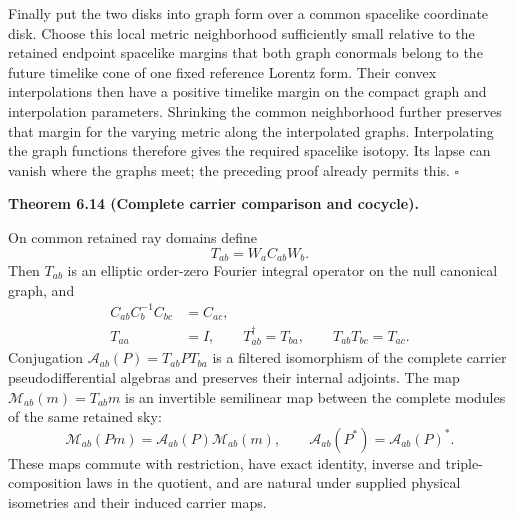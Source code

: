 \documentclass[
  english,
  11pt,
  reqno]{amsart}
\makeatletter
\newcommand{\pandocstatementheading}[1]{%
  \par\if@nobreak\else
    \addpenalty{\@beginparpenalty}%
    \addvspace{.5\baselineskip plus .2\baselineskip minus .2\baselineskip}%
  \fi
  {\normalfont\bfseries #1\par}%
  \nobreak\@afterindenttrue\@afterheading
}
\makeatother
\begin{document}
Finally put the two disks into graph form over a common spacelike
coordinate disk. Choose this local metric neighborhood sufficiently
small relative to the retained endpoint spacelike margins that both
graph conormals belong to the future timelike cone of one fixed
reference Lorentz form. Their convex interpolations then have a positive
timelike margin on the compact graph and interpolation parameters.
Shrinking the common neighborhood further preserves that margin for the
varying metric along the interpolated graphs. Interpolating the graph
functions therefore gives the required spacelike isotopy. Its lapse can
vanish where the graphs meet; the preceding proof already permits this.
\hfill\(\square\)

\pandocstatementheading{\leavevmode{}\label{thm:online-wave-carrier-cocycle}Theorem 6.14 (Complete carrier comparison and cocycle).}

On common retained ray domains define%
 \[
T_{ab}=W_aC_{ab}W_b.
\] Then \(T_{ab}\) is an elliptic order-zero Fourier integral operator
on the null canonical graph, and%
 \[
\begin{aligned}
C_{ab}C_b^{-1}C_{bc}&=C_{ac},\\
T_{aa}&=I,\qquad T_{ab}^\dagger=T_{ba},\qquad
T_{ab}T_{bc}=T_{ac}.
\end{aligned}
\] Conjugation \(\mathcal A_{ab}(P)=T_{ab}PT_{ba}\) is a filtered
isomorphism of the complete carrier pseudodifferential algebras and
preserves their internal adjoints. The map
\(\mathcal M_{ab}(m)=T_{ab}m\) is an invertible semilinear map between
the complete modules of the same retained sky:%
\[
\mathcal M_{ab}(Pm)=\mathcal A_{ab}(P)\mathcal M_{ab}(m),
\qquad
\mathcal A_{ab}(P^*)=\mathcal A_{ab}(P)^*.
\] These maps commute with restriction, have exact identity, inverse and
triple-composition laws in the quotient, and are natural under supplied
physical isometries and their induced carrier maps.
\end{document}
